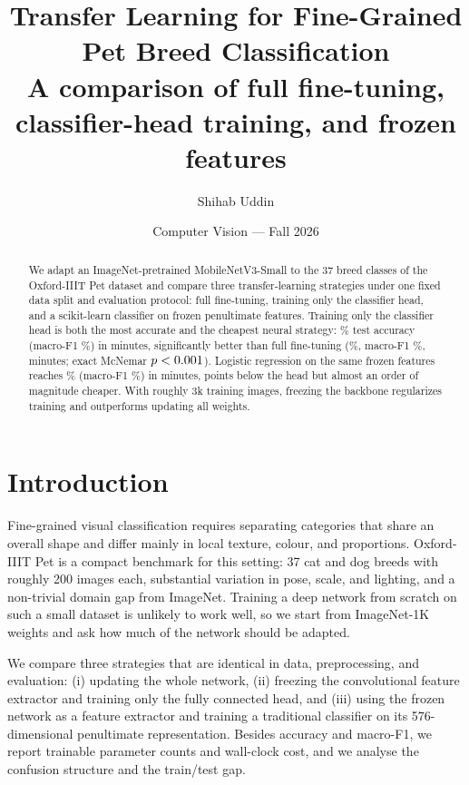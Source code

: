 \documentclass[10pt]{article}
\title{\vspace{-1.2cm}\textbf{Transfer Learning for Fine-Grained Pet Breed Classification}\\[2pt]
\large A comparison of full fine-tuning, classifier-head training, and frozen features}
\author{Shihab Uddin}
\date{Computer Vision --- Fall 2026}
\begin{document}
\maketitle
\vspace{-0.6cm}

\begin{abstract}
\noindent
We adapt an ImageNet-pretrained MobileNetV3-Small to the 37 breed classes of the
Oxford-IIIT Pet dataset and compare three transfer-learning strategies under one fixed
data split and evaluation protocol: full fine-tuning, training only the classifier head,
and a scikit-learn classifier on frozen penultimate features. Training only the
classifier head is both the most accurate and the cheapest neural strategy: \headAcc\%
test accuracy (macro-F1 \headFone\%) in \headTime{} minutes, significantly better than
full fine-tuning (\fullAcc\%, macro-F1 \fullFone\%, \fullTime{} minutes; exact McNemar
$p<0.001$). Logistic regression on the same frozen features reaches \lrAcc\%
(macro-F1 \lrFone\%) in \lrTime{} minutes, \headLrDiff{} points below the head but almost
an order of magnitude cheaper. With roughly 3k training images, freezing the backbone
regularizes training and outperforms updating all weights.
\end{abstract}

\section{Introduction}
Fine-grained visual classification requires separating categories that share an overall
shape and differ mainly in local texture, colour, and proportions. Oxford-IIIT Pet is a
compact benchmark for this setting: 37 cat and dog breeds with roughly 200 images each,
substantial variation in pose, scale, and lighting, and a non-trivial domain gap from
ImageNet. Training a deep network from scratch on such a small dataset is unlikely to
work well, so we start from ImageNet-1K weights and ask how much of the network should
be adapted.

We compare three strategies that are identical in data, preprocessing, and evaluation:
(i) updating the whole network, (ii) freezing the convolutional feature extractor and
training only the fully connected head, and (iii) using the frozen network as a feature
extractor and training a traditional classifier on its 576-dimensional penultimate
representation. Besides accuracy and macro-F1, we report trainable parameter counts and
wall-clock cost, and we analyse the confusion structure and the train/test gap.
\end{document}
